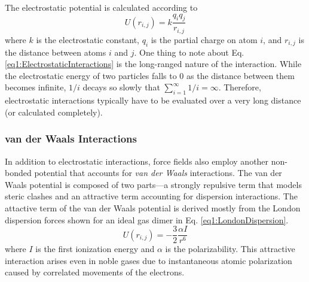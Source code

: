 The electrostatic potential is calculated according to
\begin{equation}
   U (r_{i,j}) = k \frac {q_i q_j} {r_{i,j}}
   \label{eq1:ElectrostaticInteractions}
\end{equation}
where $k$ is the electrostatic constant, $q_i$ is the partial charge on atom
$i$, and $r_{i,j}$ is the distance between atoms $i$ and $j$. One thing to note
about Eq. \ref{eq1:ElectrostaticInteractions} is the long-ranged nature of the
interaction. While the electrostatic energy of two particles falls to 0 as the
distance between them becomes infinite, $1 / i$ decays so slowly that $\sum _
{i=1}^{\infty} 1 / i = \infty$. Therefore, electrostatic interactions typically
have to be evaluated over a very long distance (or calculated completely).

\subsubsection{van der Waals Interactions}
\label{sec1:MMVDW}

In addition to electrostatic interactions, force fields also employ another
non-bonded potential that accounts for \emph{van der Waals} interactions. The
van der Waals potential is composed of two parts---a strongly repulsive term
that models steric clashes and an attractive term accounting for dispersion
interactions.  The attactive term of the van der Waals potential is derived
mostly from the London dispersion forces shown for an ideal gas dimer in Eq.
\ref{eq1:LondonDispersion}. \cite{McQuarrie_Book_PhysChem_1997}
\begin{equation}
   U(r_{i,j}) = - \frac 3 2 \frac {\alpha I} {r ^ 6}
   \label{eq1:LondonDispersion}
\end{equation}
where $I$ is the first ionization energy and $\alpha$ is the polarizability.
This attractive interaction arises even in noble gases due to instantaneous
atomic polarization caused by correlated movements of the electrons.

